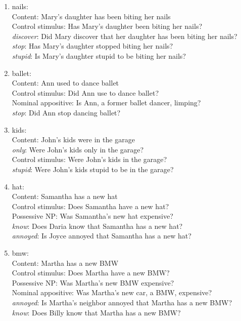 \documentclass[11pt,fleqn]{article}
\newcommand{\6}{\mbox{$[\hspace*{-.6mm}[$}}
\newcommand{\9}{\mbox{$]\hspace*{-.6mm}]$}}
\begin{document}
\begin{enumerate}
\item nails:  \\
     Content: Mary's daughter has been biting her nails\\
     Control stimulus: Has Mary's daughter been biting her nails?\\
     {\em discover}: Did Mary discover that her daughter has been biting her nails?\\
     {\em stop}: Has Mary's daughter stopped biting her nails?\\
     {\em stupid}: Is Mary's daughter stupid to be biting her nails?

\item  ballet:  \\
     Content: Ann used to dance ballet\\
     Control stimulus: Did Ann use to dance ballet?\\
     Nominal appositive: Is Ann, a former ballet dancer, limping?\\
     {\em stop}: Did Ann stop dancing ballet?

\item kids:  \\
     Content: John's kids were in the garage\\
     {\em only}: Were John's kids only in the garage?\\
     Control stimulus: Were John's kids in the garage?\\
     {\em stupid}: Were John's kids stupid to be in the garage?

\item hat:  \\
     Content: Samantha has a new hat\\
     Control stimulus: Does Samantha have a new hat?\\
     Possessive NP: Was Samantha's new hat expensive?\\
     {\em know}: Does Daria know that Samantha has a new hat?\\
     {\em annoyed}: Is Joyce annoyed that Samantha has a new hat?

\item bmw:  \\
     Content: Martha has a new BMW\\
     Control stimulus: Does Martha have a new BMW?\\
     Possessive NP: Was Martha's new BMW expensive?\\
     Nominal appositive: Was Martha's new car, a BMW, expensive?\\
     {\em annoyed}: Is Martha's neighbor annoyed that Martha has a new BMW?\\
     {\em know}: Does Billy know that Martha has a new BMW?


\end{enumerate}
\end{document}
